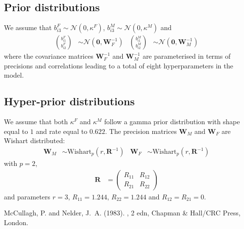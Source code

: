 \documentclass[a4paper,11pt]{article}
\begin{document}
\subsection*{Prior distributions}
We assume that $b_{i3}^F \sim \mathcal{N}(0, \kappa^F)$,  
$b_{i3}^M \sim \mathcal{N}(0, \kappa^M)$ and 
\begin{align*}
  {b_{i1}^F}\choose{b_{i2}^F} &\sim \mathcal{N}(\bm{0}, \mathbf{W}^{-1}_F)&
  {b_{i1}^M}\choose{b_{i2}^M} &\sim \mathcal{N}(\bm{0}, \mathbf{W}^{-1}_M)  
\end{align*}
where the covariance matrices $\mathbf{W}^{-1}_F$ and $\mathbf{W}^{-1}_M$ are 
parameterised in terms of precisions and correlations leading to a 
total of eight hyperparameters in the model.

\subsection*{Hyper-prior distributions}
We assume that both $\kappa^F$ and $\kappa^M$ follow a gamma prior distribution
with shape equal to $1$ and rate equal to $0.622$. 
The precision matrices $\mathbf{W}_M$ and $\mathbf{W}_F$ are Wishart distributed:
\begin{align*}
  \mathbf{W}_M &\sim \text{Wishart}_{p}(r, \mathbf{R}^{-1})&
  \mathbf{W}_F &\sim \text{Wishart}_{p}(r, \mathbf{R}^{-1})
\end{align*}
with $p=2$, 
\begin{align*}
    \mathbf{R} &= \left(\begin{array}{cc}
          R_{11} &R_{12}\\
          R_{21} & R_{22}
      \end{array}\right)  
\end{align*}
and parameters $r=3$, $R_{11}= 1.244$, $R_{22}=1.244$ and 
$R_{12}=R_{21}=0$.


\begin{thebibliography}{xx}
McCullagh, P. and Nelder, J.~A.  (1983).
, 2 edn, Chapman \& Hall/CRC Press,
  London.
\end{thebibliography}
\end{document}
